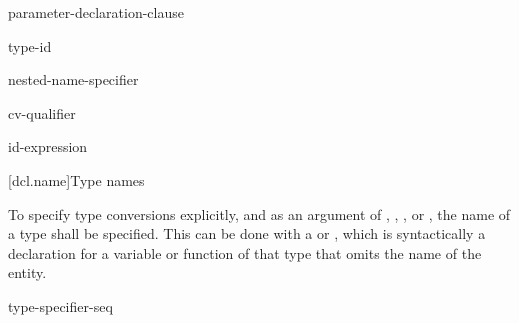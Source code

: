 \begin{bnf}
\br
    \terminal{(} parameter-declaration-clause \terminal{)} \br
    \bnfindent{}  
\end{bnf}

\begin{bnf}
\br
    \terminal{->} type-id
\end{bnf}

\begin{bnf}
\br
    \terminal{*}  \br
    \terminal{\&} \br
    \terminal{\&\&} \br
    nested-name-specifier \terminal{*}  
\end{bnf}

\begin{bnf}
\br
    cv-qualifier 
\end{bnf}

\begin{bnf}
\br
    \br
\end{bnf}

\begin{bnf}
\br
    \terminal{\&}\br
    \terminal{\&\&}
\end{bnf}

\begin{bnf}
\br
     id-expression
\end{bnf}

[dcl.name]{Type names}

\pnum
{}%
To specify type conversions explicitly,
%
and as an argument of
,
,
,
or
,
the name of a type shall be specified.
This can be done with a
 or ,
which is syntactically a declaration for a variable or function
of that type that omits the name of the entity.

\begin{bnf}
\br
    type-specifier-seq 
\end{bnf}

